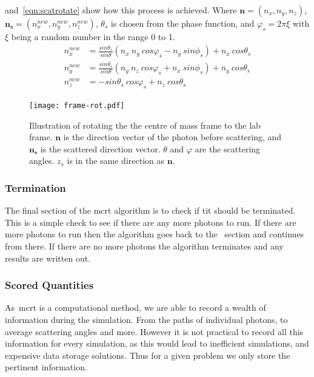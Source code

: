 \medskip

 and~\cref{eqn:scatrotate} show how this process is achieved.
Where $\mathbf{n}=(n_x,n_y,n_z)$, $\mathbf{n_s}=(n_{x}^{new},n_{y}^{new},n_{z}^{new})$, $\theta_s$ is chosen from the phase function, and $\varphi_s=2\pi \xi$ with $\xi$ being a random number in the range 0 to 1.
\begin{equation}
	\begin{aligned}
		n_{x}^{new} &= \frac{sin\theta_s}{sin\theta} \left(n_x\ n_y\ cos\varphi_s - n_y\ sin\phi_s\right) + n_x\ cos\theta_s \\
		n_{y}^{new} &= \frac{sin\theta_s}{sin\theta} \left(n_y\ n_z\ cos\varphi_s + n_x\ sin\phi_s\right) + n_y\ cos\theta_s \\
		n_{z}^{new} &= -sin\theta_s\ cos\varphi_s + n_z\ cos\theta_s
	\end{aligned}
	\label{eqn:scatrotate}
\end{equation}



\begin{figure}[!ht]
	\centering
	\texttt{[image: frame-rot.pdf]}
	\caption{Illustration of rotating the the centre of mass frame to the lab frame. $\mathbf{n}$ is the direction vector of the photon before scattering, and $\mathbf{n_s}$ is the scattered direction vector. $\theta$ and $\varphi$ are the scattering angles. $z_s$ is in the same direction as $\mathbf{n}$.}
	\label{fig:labframerotate}
\end{figure}


\subsubsection*{Termination}\label{sec:terminator}

The final section of the \gls*{mcrt} algorithm is to check if tit should be terminated. This is a simple check to see if there are any more photons to run.
If there are more photons to run then the algorithm goes back to the~ section and continues from there.
If there are no more photons the algorithm terminates and any results are written out.


\subsubsection*{Scored Quantities}\label{sec:fluencecalc}

As~\gls*{mcrt} is a computational method, we are able to record a wealth of information during the simulation.
From the paths of individual photons, to average scattering angles and more.
However it is not practical to record all this information for every simulation, as this would lead to inefficient simulations, and expensive data storage solutions.
Thus for a given problem we only store the pertinent information.

